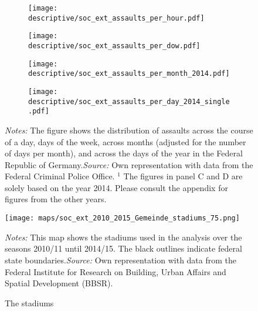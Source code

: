 \documentclass[11pt, a4paper, draft]{article} %
\begin{document}
\vspace*{\fill}
\begin{figure}[H]\centering
	\caption{Distribution of assaults across time}\label{fig_soc_ext:assault_time_distribution_2014}
	\begin{subfigure}[h]{0.48\linewidth}\centering
		\texttt{[image: descriptive/soc\_ext\_assaults\_per\_hour.pdf]}
	\end{subfigure}
	\begin{subfigure}[h]{0.48\linewidth}\centering
		\texttt{[image: descriptive/soc\_ext\_assaults\_per\_dow.pdf]}
	\end{subfigure}

	\begin{subfigure}[h]{0.48\linewidth}\centering
		\texttt{[image: descriptive/soc\_ext\_assaults\_per\_month\_2014.pdf]}
	\end{subfigure}
	\begin{subfigure}[h]{0.48\linewidth}\centering
		\texttt{[image: descriptive/soc\_ext\_assaults\_per\_day\_2014\_single.pdf]}
	\end{subfigure}
	\begin{minipage}{\linewidth}
		\scriptsize{\emph{Notes:} The figure shows the distribution of assaults across the course of a day, days of the week, across months (adjusted for the number of days per month), and across the days of the year in the Federal Republic of Germany.\newline \emph{Source:} Own representation with data from the Federal Criminal Police Office.\newline \hspace{1 em} $^1$ The figures in panel C and D are solely based on the year 2014. Please consult the appendix for figures from the other years.}
	\end{minipage}
\end{figure}
\vspace*{\fill}\clearpage



\vspace*{\fill}
\begin{figure}[H]\centering
	\caption{The stadiums}\label{fig_soc_ext:map_gem_stadiums}
	\texttt{[image: maps/soc\_ext\_2010\_2015\_Gemeinde\_stadiums\_75.png]}
	\begin{minipage}{0.95\linewidth}
		\scriptsize{\emph{Notes:} This map shows the stadiums used in the analysis over the seasons 2010/11 until 2014/15. The black outlines indicate federal state boundaries.\newline \emph{Source:} Own representation with data from the Federal Institute for Research on Building, Urban Affairs and Spatial Development (BBSR).}
	\end{minipage}
\end{figure}
\vspace*{\fill}\clearpage
\end{document}
